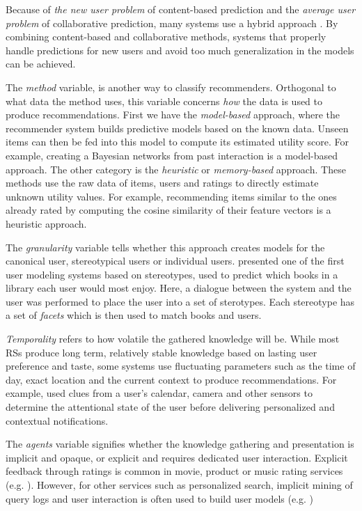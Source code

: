 Because of \emph{the new user problem} of content-based prediction and the \emph{average user problem} of collaborative prediction, 
many systems use a hybrid approach \citep{Burke2007}.
By combining content-based and collaborative methods, 
systems that properly handle predictions for new users and avoid too much generalization in the models can be achieved. 

The \emph{method} variable, is another way to classify recommenders. Orthogonal to what data the method uses, this variable
concerns \emph{how} the data is used to produce recommendations.
First we have the \emph{model-based} approach, where the recommender system builds predictive models based on the known data. 
Unseen items can then be fed into this model to compute its estimated utility score. 
For example, creating a Bayesian networks from past interaction is a model-based approach.
The other category is the \emph{heuristic} or \emph{memory-based} approach. 
These methods use the raw data of items, users and ratings to directly estimate unknown utility values. 
For example, recommending items similar to the ones already rated by computing the cosine similarity of their feature vectors is a heuristic approach.


The \emph{granularity} variable tells whether this approach creates models for the canonical user, stereotypical users or individual users. 
\cite{Rich1979} presented one of the first user modeling systems based on stereotypes, used to predict which books in a library each user would most enjoy.
Here, a dialogue between the system and the user was performed to place the user into a set of sterotypes. 
Each stereotype has a set of \emph{facets} which is then used to match books and users.

\emph{Temporality} refers to how volatile the gathered knowledge will be.
While most RSs produce long term, relatively stable knowledge based on lasting user preference and taste, 
some systems use fluctuating parameters such as the time of day, exact location and the current context to produce recommendations.
For example, \cite{Horvitz} used clues from a user's calendar, camera and other sensors to determine the attentional state
of the user before delivering personalized and contextual notifications.

The \emph{agents} variable signifies whether the knowledge gathering and presentation is implicit and opaque, 
or explicit and requires dedicated user interaction. Explicit feedback through ratings is 
common in movie, product or music rating services (e.g. \cite{Bell2007, Basu1998, Hotho}). However, for other services such as personalized search,
implicit mining of query logs and user interaction is often used to build user models (e.g. \cite{Shen2005, Agichtein2006, Speretta2000, Teevan2005})


